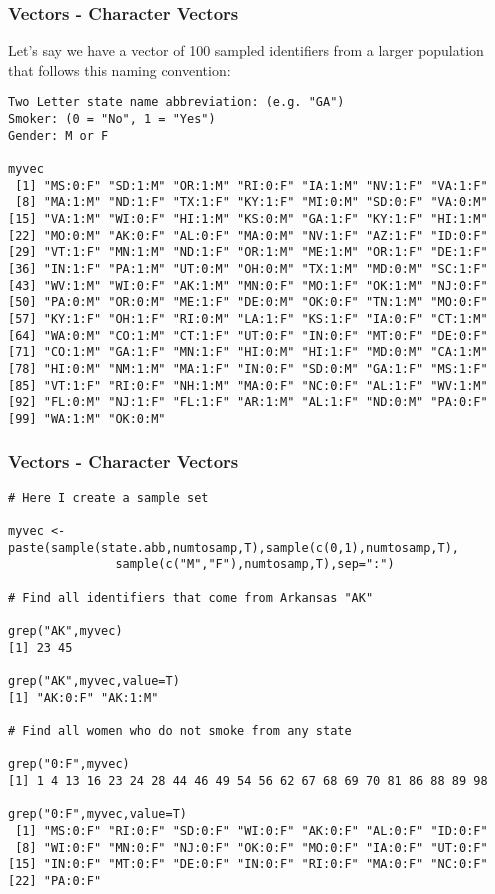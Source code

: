 \documentclass{beamer}
\begin{document}
%
\begin{frame}[fragile]
\frametitle{Vectors - Character Vectors}
Let's say we have a vector of 100 sampled identifiers from a larger population that follows this naming convention:
\scriptsize
\begin{verbatim}
Two Letter state name abbreviation: (e.g. "GA")
Smoker: (0 = "No", 1 = "Yes")
Gender: M or F

myvec
 [1] "MS:0:F" "SD:1:M" "OR:1:M" "RI:0:F" "IA:1:M" "NV:1:F" "VA:1:F"
 [8] "MA:1:M" "ND:1:F" "TX:1:F" "KY:1:F" "MI:0:M" "SD:0:F" "VA:0:M"
[15] "VA:1:M" "WI:0:F" "HI:1:M" "KS:0:M" "GA:1:F" "KY:1:F" "HI:1:M"
[22] "MO:0:M" "AK:0:F" "AL:0:F" "MA:0:M" "NV:1:F" "AZ:1:F" "ID:0:F"
[29] "VT:1:F" "MN:1:M" "ND:1:F" "OR:1:M" "ME:1:M" "OR:1:F" "DE:1:F"
[36] "IN:1:F" "PA:1:M" "UT:0:M" "OH:0:M" "TX:1:M" "MD:0:M" "SC:1:F"
[43] "WV:1:M" "WI:0:F" "AK:1:M" "MN:0:F" "MO:1:F" "OK:1:M" "NJ:0:F"
[50] "PA:0:M" "OR:0:M" "ME:1:F" "DE:0:M" "OK:0:F" "TN:1:M" "MO:0:F"
[57] "KY:1:F" "OH:1:F" "RI:0:M" "LA:1:F" "KS:1:F" "IA:0:F" "CT:1:M"
[64] "WA:0:M" "CO:1:M" "CT:1:F" "UT:0:F" "IN:0:F" "MT:0:F" "DE:0:F"
[71] "CO:1:M" "GA:1:F" "MN:1:F" "HI:0:M" "HI:1:F" "MD:0:M" "CA:1:M"
[78] "HI:0:M" "NM:1:M" "MA:1:F" "IN:0:F" "SD:0:M" "GA:1:F" "MS:1:F"
[85] "VT:1:F" "RI:0:F" "NH:1:M" "MA:0:F" "NC:0:F" "AL:1:F" "WV:1:M"
[92] "FL:0:M" "NJ:1:F" "FL:1:F" "AR:1:M" "AL:1:F" "ND:0:M" "PA:0:F"
[99] "WA:1:M" "OK:0:M"
\end{verbatim}
\end{frame}


%
\begin{frame}[fragile]
\frametitle{Vectors - Character Vectors}
\scriptsize
\begin{verbatim}
# Here I create a sample set

myvec <- paste(sample(state.abb,numtosamp,T),sample(c(0,1),numtosamp,T),
               sample(c("M","F"),numtosamp,T),sep=":")
               
# Find all identifiers that come from Arkansas "AK"

grep("AK",myvec)
[1] 23 45

grep("AK",myvec,value=T)
[1] "AK:0:F" "AK:1:M"

# Find all women who do not smoke from any state

grep("0:F",myvec)
[1] 1 4 13 16 23 24 28 44 46 49 54 56 62 67 68 69 70 81 86 88 89 98

grep("0:F",myvec,value=T)
 [1] "MS:0:F" "RI:0:F" "SD:0:F" "WI:0:F" "AK:0:F" "AL:0:F" "ID:0:F"
 [8] "WI:0:F" "MN:0:F" "NJ:0:F" "OK:0:F" "MO:0:F" "IA:0:F" "UT:0:F"
[15] "IN:0:F" "MT:0:F" "DE:0:F" "IN:0:F" "RI:0:F" "MA:0:F" "NC:0:F"
[22] "PA:0:F"
\end{verbatim}
\end{frame}
\end{document}
